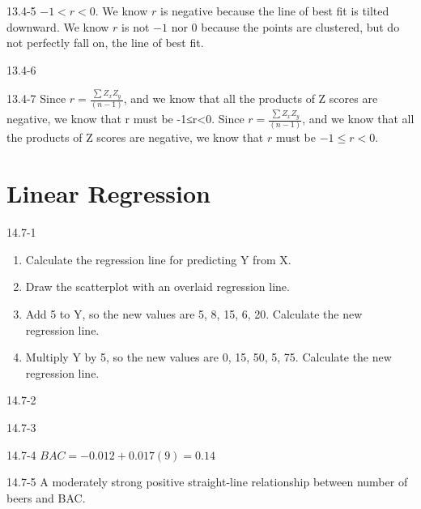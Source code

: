 \begin{exsol@solution}{13.4-5}
$ -1 < r < 0$. We know $r$ is negative because the line of best fit is tilted downward. We know $r$ is not $-1$ nor $0$ because the points are clustered, but do not perfectly fall on, the line of best fit.

\end{exsol@solution}
\begin{exsol@solution}{13.4-6}
\end{exsol@solution}
\begin{exsol@solution}{13.4-7}
Since $ r = \frac{ \sum Z_x Z_y}{(n - 1)}$, and we know that all the products of Z scores are negative, we know that r must be -1≤r<0. Since $ r = \frac{ \sum Z_x Z_y}{(n - 1)}$, and we know that all the products of Z scores are negative, we know that $r$ must be $-1 \le r < 0$.
\end{exsol@solution}
\setcounter{chapter}{14}\chapter{Linear Regression}
\begin{exsol@solution}{14.7-1}
\begin{enumerate}
  \item Calculate the regression line for predicting Y from X.
  \item Draw the scatterplot with an overlaid regression line.
  \item Add 5 to Y, so the new values are 5, 8, 15, 6, 20.  Calculate the new regression line.
  \item Multiply Y by 5, so the new values are 0, 15, 50, 5, 75.  Calculate the new regression line.
\end{enumerate}

\end{exsol@solution}
\begin{exsol@solution}{14.7-2}
\end{exsol@solution}
\begin{exsol@solution}{14.7-3}

\end{exsol@solution}
\begin{exsol@solution}{14.7-4}
     $ BAC = -0.012 + 0.017 (9) = 0.14 $
\end{exsol@solution}
\begin{exsol@solution}{14.7-5}
    A moderately strong positive straight-line relationship between number of beers and BAC.
\end{exsol@solution}
